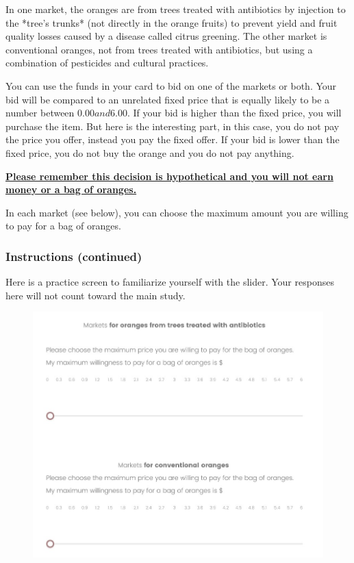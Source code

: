 \documentclass[12pt]{article}
\begin{document}
{In one market, the oranges are from trees treated with antibiotics by injection to the *tree’s trunks* (not directly in the orange fruits) to prevent yield and fruit quality losses caused by a disease called citrus greening. The other market is conventional oranges, not from trees treated with antibiotics, but using a combination of pesticides and cultural practices.

You can use the funds in your card to bid on one of the markets or both. Your bid will be compared to an unrelated fixed price that is equally likely to be a number between $0.00 and $6.00. If your bid is higher than the fixed price, you will purchase the item. But here is the interesting part, in this case, you do not pay the price you offer, instead you pay the fixed offer. If your bid is lower than the fixed price, you do not buy the orange and you do not pay anything. 

\vspace{0.5cm}

\textbf{\underline{Please remember this decision is hypothetical and you will not earn money or a bag of oranges.}} 

In each market (see below), you can choose the maximum amount you are willing to pay for a bag of oranges.
\clearpage

\subsubsection{\textbf{Instructions (continued)}}
 Here is a practice screen to familiarize yourself with the slider. Your responses here will not count toward the main study.

\begin{figure}[H]
    \centering
    \includegraphics[width=0.8\linewidth]{BDM_market.jpg}


\end{figure}}
\end{document}

